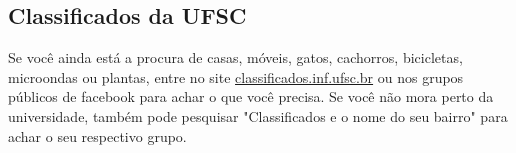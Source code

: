 \subsection{Classificados da UFSC}
Se você ainda está a procura de casas, móveis, gatos, cachorros, bicicletas, microondas ou plantas, entre no site \url{classificados.inf.ufsc.br}
ou nos grupos públicos de facebook para achar o que você precisa. Se você não mora perto da universidade, também pode pesquisar "Classificados e o nome do seu bairro"  para achar o seu respectivo grupo.

